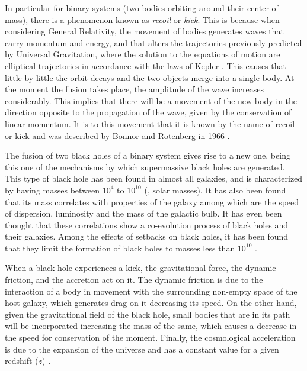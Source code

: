 	In particular for binary systems (two bodies orbiting around their center of mass), there is a phenomenon known as \textit{recoil} or \textit{kick}. This is because when considering General Relativity, the movement of bodies generates waves that carry momentum and energy, and that alters the trajectories previously predicted by Universal Gravitation, where the solution to the equations of motion are elliptical trajectories in accordance with the laws of Kepler \cite{hughes2005black, hoyng2006gravitational, brugmann2018fundamentals}. This causes that little by little the orbit decays and the two objects merge into a single body. At the moment the fusion takes place, the amplitude of the wave increases considerably. This implies that there will be a movement of the new body in the direction opposite to the propagation of the wave, given by the conservation of linear momentum. It is to this movement that it is known by the name of recoil or kick and was described by Bonnor and Rotenberg in 1966 \cite{hughes2005black, bonnor1966gravitational}.
	
	The fusion of two black holes of a binary system gives rise to a new one, being this one of the mechanisms by which supermassive black holes are generated. This type of black hole has been found in almost all galaxies, and is characterized by having masses between $10^4$ \sm to $10^{10}$ \sm (\sm, solar masses). It has also been found that its mass correlates with properties of the galaxy among which are the speed of dispersion, luminosity and the mass of the galactic bulb. It has even been thought that these correlations show a co-evolution process of black holes and their galaxies. Among the effects of setbacks on black holes, it has been found that they limit the formation of black holes to masses less than $10^{10}$ \sm \cite{choksi2017recoiling}.
	
	When a black hole experiences a kick, the gravitational force, the dynamic friction, and the accretion act on it. The dynamic friction is due to the interaction of a body in movement with the surrounding non-empty space of the host galaxy, which generates drag on it decreasing its speed. On the other hand, given the gravitational field of the black hole, small bodies that are in its path will be incorporated increasing the mass of the same, which causes a decrease in the speed for conservation of the moment. Finally, the cosmological acceleration is due to the expansion of the universe and has a constant value for a given redshift ($z$) \cite{choksi2017recoiling}.
	
